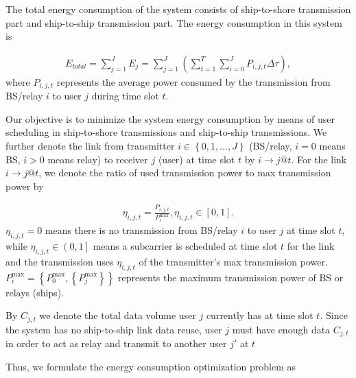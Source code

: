 \documentclass[conference]{IEEEtran}
\begin{document}
The total energy consumption of the system consists of ship-to-shore transmission part and ship-to-ship transmission part. The energy consumption in this system is

\begin{align}
{{E_{total}} = \sum\limits_{j = 1}^J {{E_j}}  = \sum\limits_{j = 1}^J {\left( {\sum\limits_{t = 1}^T {\sum\limits_{i = 0}^J {{P_{i,j,t}}\Delta \tau } } } \right)} },
\end{align}
where ${P_{i,j,t}}$ represents the average power consumed by the transmission from BS/relay $i$ to user $j$ during time slot $t$.

Our objective is to minimize the system energy consumption by means of user scheduling in ship-to-shore transmissions and ship-to-ship transmissions. We further denote the link from transmitter $i \in \left\{ {0,1,...,J} \right\}$ (BS/relay, $i = 0$ means BS, $i > 0$ means relay) to receiver $j$ (user) at time slot $t$ by $i \to j@t$. For the link $i \to j@t$, we denote the ratio of used transmission power to max transmission power by 

\begin{align}
{{\eta _{i,j,t}} = \frac{{{P_{i,j,t}}}}{{P_i^{\max }}},{\eta _{i,j,t}} \in \left[ {0,1} \right]}.
\end{align}
${\eta _{i,j,t}} = 0$ means there is no transmission from BS/relay $i$ to user $j$ at time slot $t$, while ${\eta _{i,j,t}} \in \left( {0,1} \right]$ means a subcarrier is scheduled at time slot $t$ for the link and the transmission uses ${\eta _{i,j,t}}$ of the transmitter's max transmission power. $P_i^{\max } = \left\{ {P_0^{\max },\left\{ {P_j^{\max }} \right\}} \right\}$ represents the maximum transmission power of BS or relays (ships). 

By ${C_{j,t}}$ we denote the total data volume user $j$ currently has at time slot $t$. Since the system has no ship-to-ship link data reuse, user $j$ must have enough data ${C_{j,t}}$ in order to act as relay and transmit to another user $j'$ at $t$

Thus, we formulate the energy consumption optimization problem as
\end{document}
